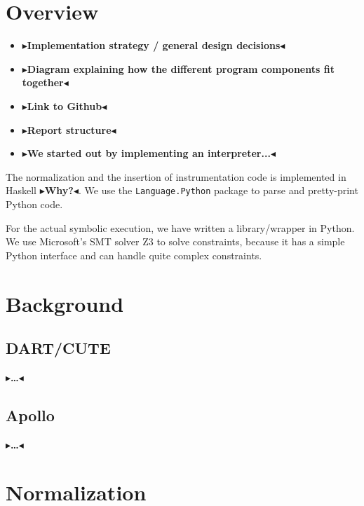 \documentclass[11pt]{report}
\newcommand{\todo}[1]{{\color[rgb]{.5,0,0}\textbf{$\blacktriangleright$#1$\blacktriangleleft$}}}
\begin{document}

\chapter{Overview}
\label{ch:overview}

\begin{itemize}
  \item \todo{Implementation strategy / general design decisions}
  \item \todo{Diagram explaining how the different program components
    fit together}
  \item \todo{Link to Github}
  \item \todo{Report structure}
  \item \todo{We started out by implementing an interpreter...}
\end{itemize}

The normalization and the insertion of instrumentation code is
implemented in Haskell \todo{Why?}. We use the \verb|Language.Python|
package to parse and pretty-print Python code.

For the actual symbolic execution, we have written a library/wrapper
in Python. We use Microsoft's SMT solver Z3 to solve constraints,
because it has a simple Python interface and can handle quite complex
constraints.





\chapter{Background}
\label{ch:background}

\section{DART/CUTE}
\todo{\dots}

\section{Apollo}
\todo{\dots}


\chapter{Normalization}
\label{ch:norm}
\end{document}
